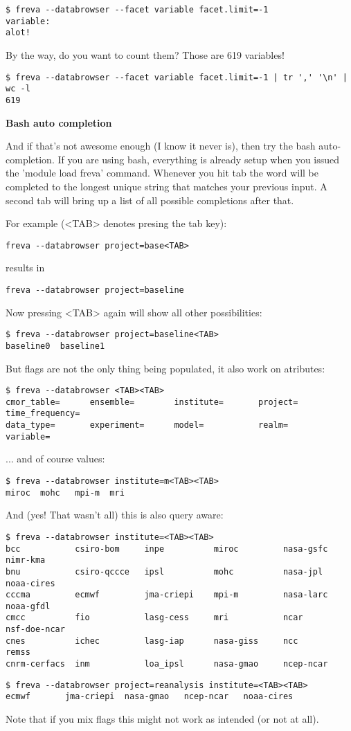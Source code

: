 \documentclass[a4paper,11pt]{ltxdoc}
\begin{document}
\begin{verbatim}
$ freva --databrowser --facet variable facet.limit=-1
variable:
alot!
\end{verbatim} 
By the way, do you want to count them? Those are 619 variables!
\begin{verbatim}
$ freva --databrowser --facet variable facet.limit=-1 | tr ',' '\n' | wc -l
619
\end{verbatim}

\textbf{Bash auto completion}

And if that's not awesome enough (I know it never is), then try the bash auto-completion. If you are using bash, everything is already setup when you issued the 'module load freva' command. Whenever you hit tab the word will be completed to the longest unique string that matches your previous input. A second tab will bring up a list of all possible completions after that.

For example (<TAB> denotes presing the tab key):
\begin{verbatim}
freva --databrowser project=base<TAB>
\end{verbatim}

results in
\begin{verbatim}
freva --databrowser project=baseline
\end{verbatim}

Now pressing <TAB> again will show all other possibilities:
\begin{verbatim}
$ freva --databrowser project=baseline<TAB>
baseline0  baseline1
\end{verbatim}
But flags are not the only thing being populated, it also work on atributes:
\begin{verbatim}
$ freva --databrowser <TAB><TAB>
cmor_table=      ensemble=        institute=       project=         time_frequency=
data_type=       experiment=      model=           realm=           variable=
\end{verbatim}
... and of course values:
\begin{verbatim}
$ freva --databrowser institute=m<TAB><TAB>
miroc  mohc   mpi-m  mri
\end{verbatim}
And (yes! That wasn't all) this is also query aware:
\begin{verbatim}
$ freva --databrowser institute=<TAB><TAB>
bcc           csiro-bom     inpe          miroc         nasa-gsfc     nimr-kma
bnu           csiro-qccce   ipsl          mohc          nasa-jpl      noaa-cires
cccma         ecmwf         jma-criepi    mpi-m         nasa-larc     noaa-gfdl
cmcc          fio           lasg-cess     mri           ncar          nsf-doe-ncar
cnes          ichec         lasg-iap      nasa-giss     ncc           remss
cnrm-cerfacs  inm           loa_ipsl      nasa-gmao     ncep-ncar     
\end{verbatim}
\begin{verbatim}
$ freva --databrowser project=reanalysis institute=<TAB><TAB>
ecmwf       jma-criepi  nasa-gmao   ncep-ncar   noaa-cires 
\end{verbatim}
Note that if you mix flags this might not work as intended (or not at all).
\end{document}
